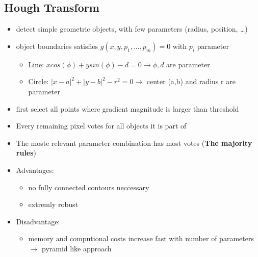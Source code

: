 \documentclass[11pt]{article}
\begin{document}
\subsection{Hough Transform}
\label{sec-2-4}
\begin{itemize}
\item detect simple geometric objects, with few parameters (radius, position, \ldots{})
\item object boundaries satisfies $g(x,y, p_1,...,p_m) = 0$ with $p_i$ parameter
\begin{itemize}
\item Line: \( x cos(\phi) +y sin(\phi) -d = 0 \rightarrow \phi, d\) are parameter
\item Circle: \( |x-a|^2 + |y-b|^2 -r^2 = 0 \rightarrow \) center (a,b) and 
radius r are parameter
\end{itemize}
\item first select all points where gradient magnitude is larger than threshold
\item Every remaining pixel votes for all objects it is part of
\item The moste relevant parameter combination has most votes (\textbf{The majority rules})
\item Advantages:
\begin{itemize}
\item no fully connected contours neccessary
\item extremly robust
\end{itemize}
\item Disadvantage:
\begin{itemize}
\item memory and computional costs increase fast with number of parameters
       $\rightarrow$ pyramid like approach
\end{itemize}
\end{itemize}
\end{document}
